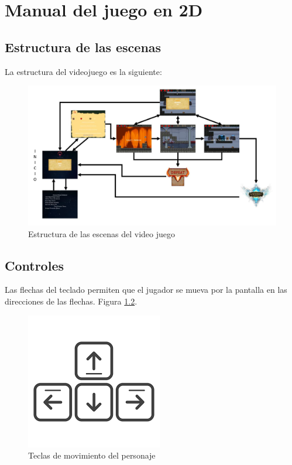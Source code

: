 \chapter{Manual del juego en 2D}

\section{Estructura de las escenas}

La estructura del videojuego es la siguiente: 

\begin{figure}[H]
	\centering
	\includegraphics[scale=0.50]{imagenes/Estructura_escena.png}
	\caption{\label{fig:Estructura_escena}Estructura de las escenas del video juego}
\end{figure}

\section{Controles}

Las flechas del teclado permiten que el jugador se mueva por la pantalla en las direcciones de las flechas. Figura \ref{fig:flechasTeclado}.

\begin{figure}[H]
	\centering
	\includegraphics[scale=0.50]{imagenes/flechas_teclado.png}
	\caption{\label{fig:flechasTeclado}Teclas de movimiento del personaje}
\end{figure}

